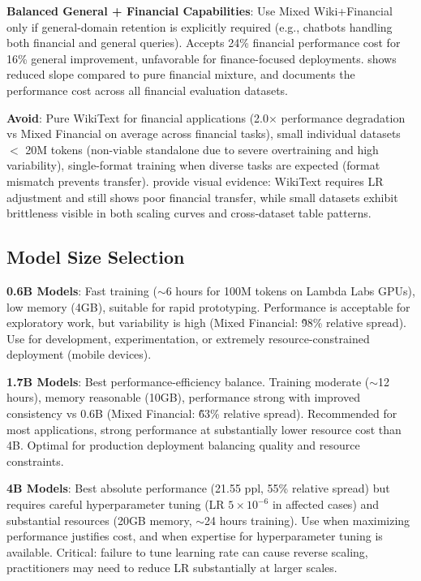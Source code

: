 \textbf{Balanced General + Financial Capabilities}: Use Mixed Wiki+Financial only if general-domain retention is explicitly required (e.g., chatbots handling both financial and general queries). Accepts 24\% financial performance cost for 16\% general improvement, unfavorable for finance-focused deployments.  shows reduced slope compared to pure financial mixture, and  documents the performance cost across all financial evaluation datasets.

\textbf{Avoid}: Pure WikiText for financial applications (2.0$\times$ performance degradation vs Mixed Financial on average across financial tasks), small individual datasets $<$ 20M tokens (non-viable standalone due to severe overtraining and high variability), single-format training when diverse tasks are expected (format mismatch prevents transfer).  provide visual evidence: WikiText requires LR adjustment and still shows poor financial transfer, while small datasets exhibit brittleness visible in both scaling curves and cross‑dataset table patterns.

\subsection{Model Size Selection}

\textbf{0.6B Models}: Fast training ($\sim$6 hours for 100M tokens on Lambda Labs GPUs), low memory (4GB), suitable for rapid prototyping. Performance is acceptable for exploratory work, but variability is high (Mixed Financial: \~98\% relative spread). Use for development, experimentation, or extremely resource-constrained deployment (mobile devices).

\textbf{1.7B Models}: Best performance-efficiency balance. Training moderate ($\sim$12 hours), memory reasonable (10GB), performance strong with improved consistency vs 0.6B (Mixed Financial: \~63\% relative spread). Recommended for most applications, strong performance at substantially lower resource cost than 4B. Optimal for production deployment balancing quality and resource constraints.

\textbf{4B Models}: Best absolute performance (21.55 ppl, 55\% relative spread) but requires careful hyperparameter tuning (LR $5 \times 10^{-6}$ in affected cases) and substantial resources (20GB memory, $\sim$24 hours training). Use when maximizing performance justifies cost, and when expertise for hyperparameter tuning is available. Critical: failure to tune learning rate can cause reverse scaling, practitioners may need to reduce LR substantially at larger scales.

